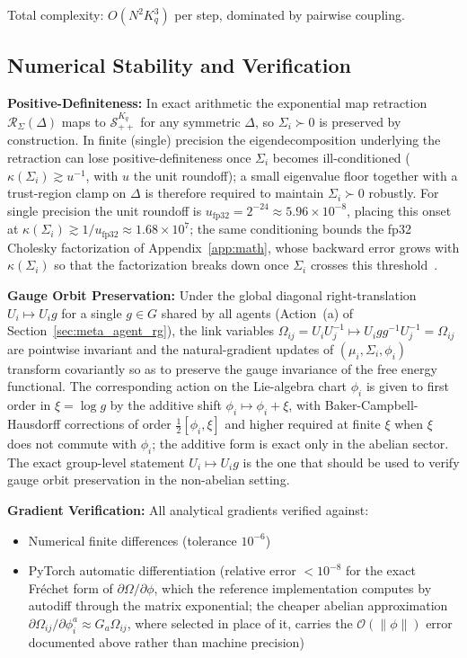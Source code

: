 \documentclass[11pt]{article}
\begin{document}
Total complexity: $O(N^2 K_q^3)$ per step, dominated by pairwise coupling.

\subsection*{Numerical Stability and Verification}

\textbf{Positive-Definiteness:} In exact arithmetic the exponential map retraction $\mathcal{R}_{\Sigma}(\Delta)$ maps to $\mathcal{S}_{++}^{K_q}$ for any symmetric $\Delta$, so $\Sigma_i \succ 0$ is preserved by construction. In finite (single) precision the eigendecomposition underlying the retraction can lose positive-definiteness once $\Sigma_i$ becomes ill-conditioned ($\kappa(\Sigma_i) \gtrsim u^{-1}$, with $u$ the unit roundoff); a small eigenvalue floor together with a trust-region clamp on $\Delta$ is therefore required to maintain $\Sigma_i \succ 0$ robustly. For single precision the unit roundoff is $u_{\mathrm{fp32}} = 2^{-24} \approx 5.96 \times 10^{-8}$, placing this onset at $\kappa(\Sigma_i) \gtrsim 1/u_{\mathrm{fp32}} \approx 1.68 \times 10^{7}$; the same conditioning bounds the fp32 Cholesky factorization of Appendix~\ref{app:math}, whose backward error grows with $\kappa(\Sigma_i)$ so that the factorization breaks down once $\Sigma_i$ crosses this threshold~\cite[Ch.~10]{Higham2002}.

\textbf{Gauge Orbit Preservation:} Under the global diagonal right-translation $U_i \mapsto U_i g$ for a single $g \in G$ shared by all agents (Action~(a) of Section~\ref{sec:meta_agent_rg}), the link variables $\Omega_{ij} = U_iU_j^{-1} \mapsto U_i g g^{-1} U_j^{-1} = \Omega_{ij}$ are pointwise invariant and the natural-gradient updates of $(\mu_i, \Sigma_i, \phi_i)$ transform covariantly so as to preserve the gauge invariance of the free energy functional. The corresponding action on the Lie-algebra chart $\phi_i$ is given to first order in $\xi = \log g$ by the additive shift $\phi_i \mapsto \phi_i + \xi$, with Baker-Campbell-Hausdorff corrections of order $\tfrac{1}{2}[\phi_i, \xi]$ and higher required at finite $\xi$ when $\xi$ does not commute with $\phi_i$; the additive form is exact only in the abelian sector. The exact group-level statement $U_i \mapsto U_i g$ is the one that should be used to verify gauge orbit preservation in the non-abelian setting.

\textbf{Gradient Verification:} All analytical gradients verified against:
\begin{itemize}
\item Numerical finite differences (tolerance $10^{-6}$)
\item PyTorch automatic differentiation (relative error $< 10^{-8}$ for the exact Fr\'echet form of $\partial\Omega/\partial\phi$, which the reference implementation computes by autodiff through the matrix exponential; the cheaper abelian approximation $\partial\Omega_{ij}/\partial\phi_i^a \approx G_a\Omega_{ij}$, where selected in place of it, carries the $\mathcal{O}(\|\phi\|)$ error documented above rather than machine precision)
\end{itemize}
\end{document}
